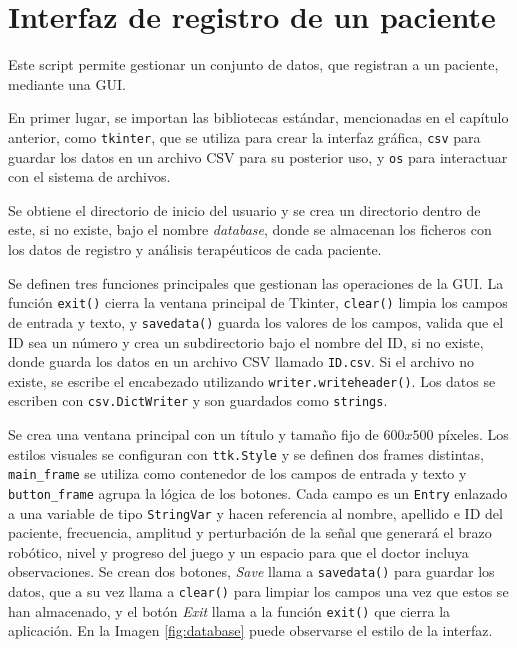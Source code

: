 \section{Interfaz de registro de un paciente}
\label{section:registro}

Este script permite gestionar un conjunto de datos, que registran a un paciente, mediante una GUI.

En primer lugar, se importan las bibliotecas estándar, mencionadas en el capítulo anterior, como \verb|tkinter|, que se utiliza para crear la interfaz gráfica, \verb|csv| para guardar los datos en un archivo CSV para su posterior uso, y \verb|os| para interactuar con el sistema de archivos.

Se obtiene el directorio de inicio del usuario y se crea un directorio dentro de este, si no existe, bajo el nombre \textit{database}, donde se almacenan los ficheros con los datos de registro y análisis terapéuticos de cada paciente.

Se definen tres funciones principales que gestionan las operaciones de la GUI.
La función \verb|exit()| cierra la ventana principal de Tkinter, \verb|clear()| limpia los campos de entrada y texto, y \verb|savedata()| guarda los valores de los campos, valida que el ID sea un número y crea un subdirectorio bajo el nombre del ID, si no existe, donde guarda los datos en un archivo CSV llamado \verb|ID.csv|.
Si el archivo no existe, se escribe el encabezado utilizando \verb|writer.writeheader()|.
Los datos se escriben con \verb|csv.DictWriter| y son guardados como \verb|strings|.

Se crea una ventana principal con un título y tamaño fijo de $600x500$ píxeles.
Los estilos visuales se configuran con \verb|ttk.Style| y se definen dos frames distintas, \verb|main_frame| se utiliza como contenedor de los campos de entrada y texto y \verb|button_frame| agrupa la lógica de los botones.
Cada campo es un \verb|Entry| enlazado a una variable de tipo \verb|StringVar| y hacen referencia al nombre, apellido e ID del paciente, frecuencia, amplitud y perturbación de la señal que generará el brazo robótico, nivel y progreso del juego y un espacio para que el doctor incluya observaciones.
Se crean dos botones, \textit{Save} llama a \verb|savedata()| para guardar los datos, que a su vez llama a \verb|clear()| para limpiar los campos una vez que estos se han almacenado, y el botón \textit{Exit} llama a la función \verb|exit()| que cierra la aplicación.
En la Imagen \ref{fig:database} puede observarse el estilo de la interfaz.

